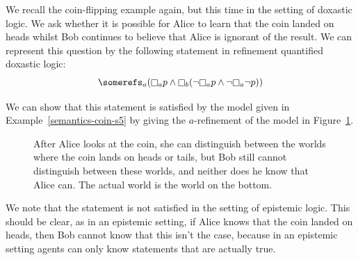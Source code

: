 \begin{example}\label{semantics-coin-kd45}
We recall the coin-flipping example again, but this time in the setting of
doxastic logic. We ask whether it is possible for Alice to learn that the coin
landed on heads whilst Bob continues to believe that Alice is ignorant of the
result. We can represent this question by the following statement in refinement
quantified doxastic logic:
$$\somerefs_a (\knows_a p \land \knows_b (\neg \knows_a p \land \neg \knows_a
\neg p))$$

We can show that this statement is satisfied by the model given in
Example~\ref{semantics-coin-s5} by giving the $a$-refinement of the
model in Figure~\ref{semantics-coin-kd45}.

\begin{figure}\label{semantics-coin-kd45}
\begin{center} 
\caption{
After Alice looks at the coin, she can distinguish between the worlds where the
coin lands on heads or tails, but Bob still cannot distinguish between these
worlds, and neither does he know that Alice can. The actual world is the world
on the bottom.
}
\end{center}
\end{figure}

We note that the statement is not satisfied in the setting of epistemic logic.
This should be clear, as in an epistemic setting, if Alice knows that the coin
landed on heads, then Bob cannot know that this isn't the case, because in an
epistemic setting agents can only know statements that are actually true.
\end{example}

